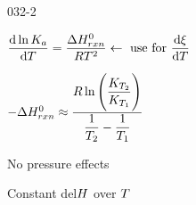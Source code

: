 \begin{mitframe}{032-2}

    
    \begin{listone}
	
    	\item $\dfrac{\mathrm{d}\ln\eqconst}{\mathrm{d}\Temp}=\dfrac{\iipf\enthalpy_{rxn}^{\init}}{\gasconst\Temp^2}\leftarrow~\text{use for}~\dfrac{\mathrm{d}\extent}{\mathrm{d}\Temp}$
    
    	\item $-\iipf\enthalpy_{rxn}^{\init}\approx\dfrac{\gasconst\ln\Bigg(\dfrac{K_{\Temp_{2}}}{K_{\Temp_{1}}}\Bigg)}{\dfrac{1}{\Temp_{2}}-\dfrac{1}{\Temp_{1}}}$
    
    	\begin{listtwo}
	
    		\item No pressure effects
        
        	\item Constant del$\enthalpy$ over $\Temp$
        
		\end{listtwo}

	\end{listone}

\end{mitframe}
